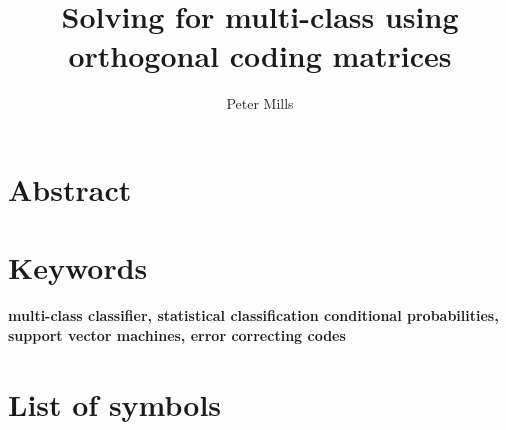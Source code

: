 \documentclass{article}
\title{Solving for multi-class using orthogonal coding matrices}
\author{Peter Mills}
\begin{document}
\maketitle

\section*{Abstract}



\section*{Keywords}
\textbf{multi-class classifier, 
	statistical classification conditional probabilities,
	support vector machines,
error correcting codes}

\tableofcontents

\section*{List of symbols}





\newpage
{}

\end{document}
